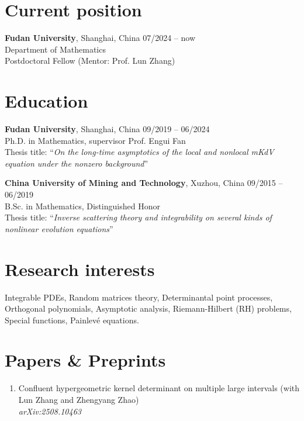 \documentclass[margin]{res}
\begin{document}
\begin{resume}
\section{Current position}
\textbf{Fudan University}, Shanghai, China \hfill 07/2024 -- now\\
Department of Mathematics \\
Postdoctoral Fellow (Mentor: Prof. Lun Zhang)


\section{Education}
\textbf{Fudan University}, Shanghai, China \hfill 09/2019 -- 06/2024\\
Ph.D. in Mathematics, supervisor Prof. Engui Fan \\
Thesis title: ``{\sl On the long-time asymptotics of the local and nonlocal mKdV equation under the nonzero background}''
\par

\textbf{China University of Mining and Technology}, Xuzhou, China \hfill 09/2015 -- 06/2019\\ 
B.Sc. in Mathematics, Distinguished Honor \\
Thesis title: ``{\sl Inverse scattering theory and integrability on several kinds of nonlinear evolution equations}''


\section{Research interests}
Integrable PDEs, Random matrices theory, Determinantal point processes, 
Orthogonal polynomials, Asymptotic analysis, Riemann-Hilbert (RH) problems, Special functions, 
Painlev\'e equations.

\section{Papers \& Preprints}
\begin{enumerate}[1.]
    \item Confluent hypergeometric kernel determinant on multiple large intervals (with Lun Zhang and Zhengyang Zhao)\\
    {\sl arXiv:2508.10463}


\end{enumerate}
\end{resume}
\end{document}
